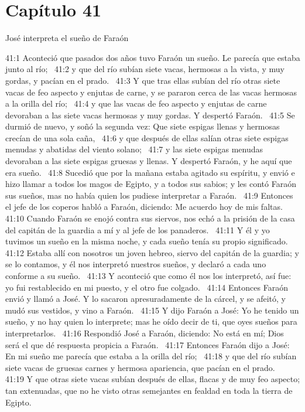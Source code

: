 \section*{Capítulo 41 }
José interpreta el sueño de Faraón  

41:1 Aconteció que pasados dos años tuvo Faraón un sueño. Le parecía que estaba junto al río;  
41:2 y que del río subían siete vacas, hermosas a la vista, y muy gordas, y pacían en el prado.  
41:3 Y que tras ellas subían del río otras siete vacas de feo aspecto y enjutas de carne, y se pararon cerca de las vacas hermosas a la orilla del río;  
41:4 y que las vacas de feo aspecto y enjutas de carne devoraban a las siete vacas hermosas y muy gordas. Y despertó Faraón.  
41:5 Se durmió de nuevo, y soñó la segunda vez: Que siete espigas llenas y hermosas crecían de una sola caña,  
41:6 y que después de ellas salían otras siete espigas menudas y abatidas del viento solano;  
41:7 y las siete espigas menudas devoraban a las siete espigas gruesas y llenas. Y despertó Faraón, y he aquí que era sueño.  
41:8 Sucedió que por la mañana estaba agitado su espíritu, y envió e hizo llamar a todos los magos de Egipto, y a todos sus sabios; y les contó Faraón sus sueños, mas no había quien los pudiese interpretar a Faraón.  
41:9 Entonces el jefe de los coperos habló a Faraón, diciendo: Me acuerdo hoy de mis faltas.  
41:10 Cuando Faraón se enojó contra sus siervos, nos echó a la prisión de la casa del capitán de la guardia a mí y al jefe de los panaderos.  
41:11 Y él y yo tuvimos un sueño en la misma noche, y cada sueño tenía su propio significado.  
41:12 Estaba allí con nosotros un joven hebreo, siervo del capitán de la guardia; y se lo contamos, y él nos interpretó nuestros sueños, y declaró a cada uno conforme a su sueño.  
41:13 Y aconteció que como él nos los interpretó, así fue: yo fui restablecido en mi puesto, y el otro fue colgado.  
41:14 Entonces Faraón envió y llamó a José. Y lo sacaron apresuradamente de la cárcel, y se afeitó, y mudó sus vestidos, y vino a Faraón.  
41:15 Y dijo Faraón a José: Yo he tenido un sueño, y no hay quien lo interprete; mas he oído decir de ti, que oyes sueños para interpretarlos.  
41:16 Respondió José a Faraón, diciendo: No está en mí; Dios será el que dé respuesta propicia a Faraón.  
41:17 Entonces Faraón dijo a José: En mi sueño me parecía que estaba a la orilla del río;  
41:18 y que del río subían siete vacas de gruesas carnes y hermosa apariencia, que pacían en el prado.  
41:19 Y que otras siete vacas subían después de ellas, flacas y de muy feo aspecto; tan extenuadas, que no he visto otras semejantes en fealdad en toda la tierra de Egipto.  
